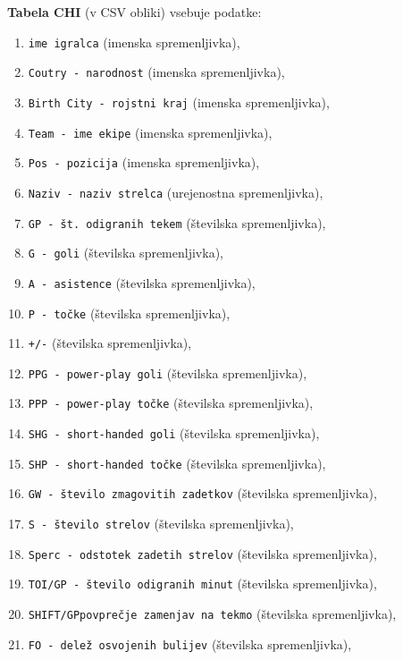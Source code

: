 \documentclass[11pt,a4paper]{article}
\begin{document}
\textbf{Tabela CHI} (v CSV obliki) vsebuje podatke:
\begin{enumerate}

\item{\verb|ime igralca| (imenska spremenljivka),}
\item{\verb|Coutry - narodnost| (imenska spremenljivka),}
\item{\verb|Birth City - rojstni kraj| (imenska spremenljivka),}
\item{\verb|Team - ime ekipe| (imenska spremenljivka),}
\item{\verb|Pos - pozicija| (imenska spremenljivka),}
\item{\verb|Naziv - naziv strelca| (urejenostna spremenljivka),}
\item{\verb|GP - št. odigranih tekem| (številska spremenljivka),}
\item{\verb|G - goli| (številska spremenljivka),}
\item{\verb|A - asistence| (številska spremenljivka),}
\item{\verb|P - točke| (številska spremenljivka),}
\item{\verb|+/-| (številska spremenljivka),}
\item{\verb|PPG - power-play goli| (številska spremenljivka),}
\item{\verb|PPP - power-play točke| (številska spremenljivka),}
\item{\verb|SHG - short-handed goli| (številska spremenljivka),}
\item{\verb|SHP - short-handed točke| (številska spremenljivka),}
\item{\verb|GW - število zmagovitih zadetkov| (številska spremenljivka),}
\item{\verb|S - število strelov| (številska spremenljivka),}
\item{\verb|Sperc - odstotek zadetih strelov| (številska spremenljivka),}
\item{\verb|TOI/GP - število odigranih minut| (številska spremenljivka),}
\item{\verb|SHIFT/GPpovprečje zamenjav na tekmo| (številska spremenljivka),}
\item{\verb|FO - delež osvojenih bulijev| (številska spremenljivka),}

\end{enumerate}
\end{document}
